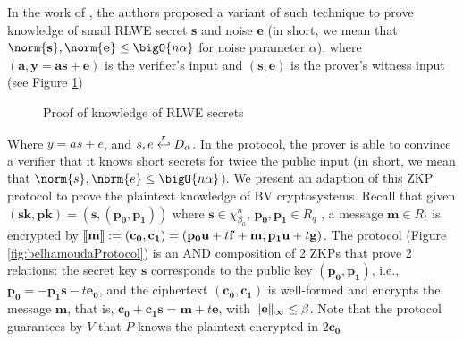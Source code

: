 In the work of \cite{benhamouda2014better}, the authors proposed a variant of
such technique to prove knowledge of small RLWE secret \textbf{s} and noise
\textbf{e} (in short, we mean that
$\norm{\mathbf{s}}, \norm{\mathbf{e}} \leq \bigO{n \alpha}$ for noise parameter
$\alpha$), where $(\mathbf{a}, \mathbf{y} = \mathbf{as} + \mathbf{e})$ is the
verifier's input and $(\mathbf{s,e})$ is the prover's witness input (see Figure
\ref{fig:benhamoudaProtocol})
\begin{figure}[htbp!] 
\centering {}
\caption{Proof of knowledge of RLWE secrets}
\label{fig:benhamoudaProtocol}
\end{figure}

Where $y = as + e$, and $s, e \stackrel{r}{\hookleftarrow} D_{\alpha}$. In the protocol, the
prover is able to convince a verifier that it knows short secrets for twice the
public input (in short, we mean that $\norm{s},\norm{e} \leq \bigO{n\alpha}$).
We present an adaption of this ZKP protocol to prove the plaintext knowledge of
BV cryptosystems. Recall that given $\mathbf{(sk,pk) = (s,(p_0,p_1))}$ where
$\mathbf{s} \in \chi_{\beta_0}^n$, $\mathbf{p_0,p_1} \in R_q$ , a message
$\mathbf{m} \in R_t$ is encrypted by
$\left\llbracket\mathbf{m}\right\rrbracket := \mathbf{(c_0, c_1)} = (\mathbf{p_0u} + t\mathbf{f + m,
  p_1u} + t\mathbf{g)}$. The protocol (Figure \ref{fig:belhamoudaProtocol}) is
an AND composition of 2 ZKPs that prove 2 relations: the secret key $\mathbf{s}$
corresponds to the public key $\mathbf{(p_0,p_1)}$, i.e.,
$\mathbf{p_0 = -p_1s} - t\mathbf{e_0}$, and the ciphertext $\mathbf{(c_0,c_1)}$
is well-formed and encrypts the message $\mathbf{m}$, that is,
$\mathbf{c_0 + c_1s} = \mathbf{m} + t\mathbf{e}$, with
$\Vert \mathbf{e} \Vert_{\infty} \leq \beta$. Note that the protocol guarantees by $V$
that $P$ knows the plaintext encrypted in $2\mathbf{c_0}$

